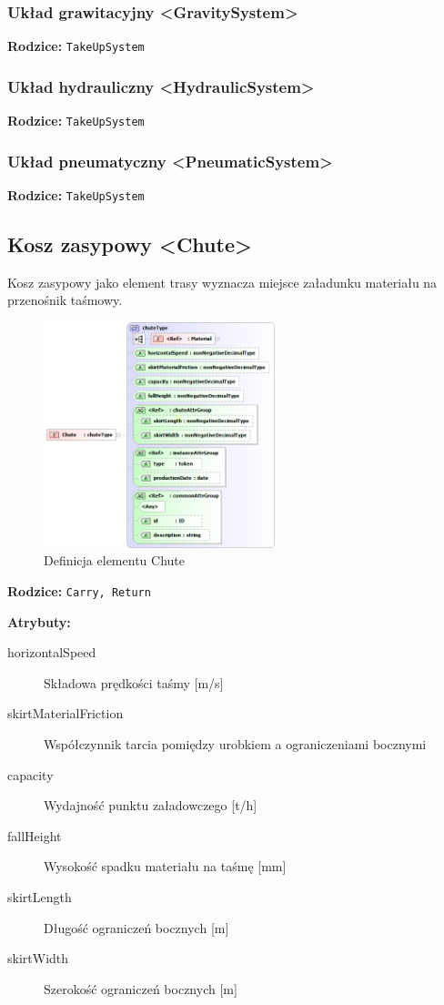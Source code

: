 \documentclass[12pt,a4paper]{article}
\begin{document}
\subsubsection{Układ grawitacyjny <GravitySystem>}

\noindent\textbf{Rodzice:} \texttt{TakeUpSystem}


\subsubsection{Układ hydrauliczny <HydraulicSystem>}

\noindent\textbf{Rodzice:} \texttt{TakeUpSystem}


\subsubsection{Układ pneumatyczny <PneumaticSystem>}

\noindent\textbf{Rodzice:} \texttt{TakeUpSystem}

\subsection{Kosz zasypowy <Chute>}
Kosz zasypowy jako element trasy wyznacza miejsce załadunku materiału na
przenośnik taśmowy.

\begin{figure}[H]
  \centering
  \includegraphics[width=0.6\textwidth]{png/liquid/Chute}
  \caption{Definicja elementu Chute}
  \label{fig:chute-xsd}
\end{figure}

\noindent\textbf{Rodzice:} \texttt{Carry, Return}

\noindent\textbf{Atrybuty:}
\begin{description}
\item[horizontalSpeed] Składowa prędkości taśmy [m/s]
\item[skirtMaterialFriction] Współczynnik tarcia pomiędzy urobkiem a
  ograniczeniami bocznymi
\item[capacity] Wydajność punktu załadowczego [t/h]
\item[fallHeight] Wysokość spadku materiału na taśmę [mm]
\item[skirtLength] Długość ograniczeń bocznych [m]
\item[skirtWidth] Szerokość ograniczeń bocznych [m]
\end{description}
\end{document}
